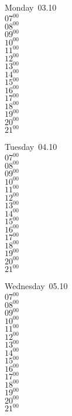 \documentclass[11pt,a4paper]{book}\usepackage[]{graphicx}\usepackage[]{color}
\begin{document}
\begin{headerbox}
\end{headerbox}
\begin{weekdaybox}
  Monday~03.10\\
  { 
  \vfill
  $07^{00}$\\
$08^{00}$\\
$09^{00}$\\
$10^{00}$\\
$11^{00}$\\
$12^{00}$\\
$13^{00}$\\
$14^{00}$\\
$15^{00}$\\
$16^{00}$\\
$17^{00}$\\
$18^{00}$\\
$19^{00}$\\
$20^{00}$\\
$21^{00}$\\
  }
\end{weekdaybox}
\begin{weekdaybox}
  Tuesday~04.10\\
  { 
  \vfill
  $07^{00}$\\
$08^{00}$\\
$09^{00}$\\
$10^{00}$\\
$11^{00}$\\
$12^{00}$\\
$13^{00}$\\
$14^{00}$\\
$15^{00}$\\
$16^{00}$\\
$17^{00}$\\
$18^{00}$\\
$19^{00}$\\
$20^{00}$\\
$21^{00}$\\
  }
\end{weekdaybox}
\begin{weekdaybox}
  Wednesday~05.10\\
  { 
  \vfill
  $07^{00}$\\
$08^{00}$\\
$09^{00}$\\
$10^{00}$\\
$11^{00}$\\
$12^{00}$\\
$13^{00}$\\
$14^{00}$\\
$15^{00}$\\
$16^{00}$\\
$17^{00}$\\
$18^{00}$\\
$19^{00}$\\
$20^{00}$\\
$21^{00}$\\
  }
\end{weekdaybox}
\end{document}

